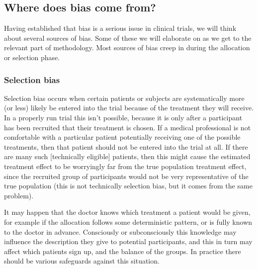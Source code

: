 \documentclass[
  openany]{book}
\theoremstyle{definition}
\theoremstyle{definition}
\theoremstyle{definition}
\theoremstyle{definition}
\theoremstyle{remark}
\begin{document}
\hypertarget{where-does-bias-come-from}{%
\subsection{Where does bias come from?}\label{where-does-bias-come-from}}

Having established that bias is a serious issue in clinical trials, we will think about several sources of bias. Some of these we will elaborate on as we get to the relevant part of methodology. Most sources of bias creep in during the allocation or selection phase.

\hypertarget{selection-bias}{%
\subsubsection*{Selection bias}\label{selection-bias}}

Selection bias occurs when certain patients or subjects are systematically more (or less) likely be entered into the trial because of the treatment they will receive. In a properly run trial this isn't possible, because it is only after a participant has been recruited that
their treatment is chosen. If a medical professional is not comfortable with a particular patient potentially receiving one of the possible treatments, then that patient should not be entered into the trial at all. If there are many such {[}technically eligible{]} patients, then this might cause the estimated treatment effect to be worryingly far from the true population treatment effect, since the recruited group of participants would not be very representative of the true population (this is not technically selection bias, but it comes from the same problem).

It may happen that the doctor knows which treatment a patient would be given, for example if the allocation follows some deterministic pattern, or is fully known to the doctor in advance. Consciously or subconsciously this knowledge may influence the description they give to potential participants, and this in turn may affect which patients sign up, and the balance of the groups. In practice there should be various safeguards against this situation.
\end{document}
